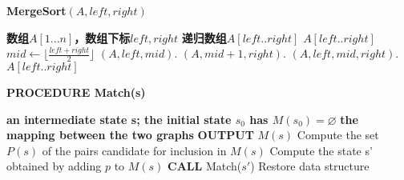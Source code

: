 \documentclass{article}
\begin{document}
\begin{CJK}{UTF8}{gbsn}
        \begin{algorithm}
            \caption{\textbf{MergeSort$(A,left,right)$}}
            \begin{algorithmic}[1] %
                \Require \textbf{数组$A[1...n]$，数组下标$left,right$}
                \Ensure \textbf{递归数组$A[left..right]$}
                    \State \Return $A[left..right]$
                \EndIf
                \State $mid \leftarrow \lfloor \frac{left+right}{2} \rfloor$
                \State {}$(A,left,mid)$.
                \State {}$(A,mid+1,right)$.
                \State {}$(A,left,mid,right)$.
                \State \Return $A[left..right]$
            \end{algorithmic}
        \end{algorithm}

     \begin{algorithm}
                \caption{\textbf{PROCEDURE Match(s)}}
                \begin{algorithmic}[1]
                    \Require \textbf{an intermediate state s; the initial state $s_0$ has $M(s_0)=\varnothing$}
                    \Ensure \textbf{the mapping between the two graphs}
                        \State \textbf{OUTPUT} $M(s)$
                    \Else
                        \State Compute the set $P(s)$ of the pairs candidate for inclusion in $M(s)$
                                \State Compute the state s' obtained by adding $p$ to $M(s)$
                                \State \textbf{CALL} Match($s'$)
                            \EndIf
                        \EndFor
                        \State Restore data structure
                    \EndIf
            \end{algorithmic}
        \end{algorithm}


\end{CJK}
\end{document}

